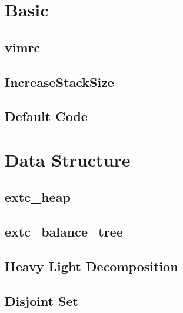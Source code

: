 \documentclass[a4paper,10pt,twocolumn,oneside]{article}
\begin{document}
\pagestyle{fancy}
\fancyfoot{}
\fancyhead[R]{\thepage}
\renewcommand{\headrulewidth}{0.4pt}
\renewcommand{\contentsname}{Contents} 

\scriptsize
\tableofcontents

\newpage

\section{Basic}
\subsection{vimrc}


\subsection{IncreaseStackSize}


\subsection{Default Code}


\section{Data Structure}

\subsection{extc\_heap}


\subsection{extc\_balance\_tree}


\subsection{Heavy Light Decomposition}


\subsection{Disjoint Set}

\end{document}
